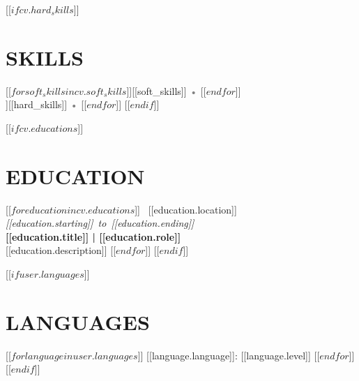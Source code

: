 \documentclass[10pt, letterpaper]{article}
\newcommand{\location}[1]{\mbox{\color{secondary_text}\faMapMarker* \ #1}}
\newcommand{\dates}[1]{\hfill\mbox{\textit{\small{\color{primaryblue}#1}}}}
\newcommand{\titlerole}[1]{\textbf{\small{#1}}}
\begin{document}
    [[$ if cv.hard_skills $]]
        \section{SKILLS}
        [[$ for soft_skills in cv.soft_skills $]][[soft_skills]] \textcolor{gray}{•} [[$ endfor $]] \\
        [[$ for hard_skills in cv.hard_skills $]][[hard_skills]] \textcolor{gray}{•} [[$ endfor $]] 
    [[$ endif $]]

    [[$ if cv.educations $]]
        \section{EDUCATION}
        [[$ for education in cv.educations $]]
            \location{[[education.location]]} \dates{[[education.starting]] to [[education.ending]]} \\
            \titlerole{[[education.title]] | [[education.role]]} \\
            \small{[[education.description]]}
            \vspace{0.2cm}
        [[$ endfor $]]
    [[$ endif $]]

    [[$ if user.languages $]]
        \section{LANGUAGES}
        [[$ for language in user.languages $]]
            {[[language.language]]}: {[[language.level]]}  
        [[$ endfor $]]
    [[$ endif $]]
\end{document}
